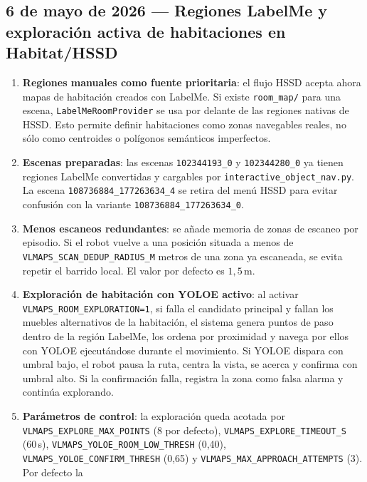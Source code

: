 \documentclass[11pt,a4paper]{article}
\begin{document}
\subsection*{6 de mayo de 2026 --- Regiones LabelMe y exploración activa de habitaciones en Habitat/HSSD}

\begin{enumerate}
  \item \textbf{Regiones manuales como fuente prioritaria}: el flujo HSSD acepta
        ahora mapas de habitación creados con LabelMe. Si existe
        \texttt{room\_map/} para una escena, \texttt{LabelMeRoomProvider} se
        usa por delante de las regiones nativas de HSSD. Esto permite definir
        habitaciones como zonas navegables reales, no sólo como centroides o
        polígonos semánticos imperfectos.
  \item \textbf{Escenas preparadas}: las escenas \texttt{102344193\_0} y
        \texttt{102344280\_0} ya tienen regiones LabelMe convertidas y
        cargables por \texttt{interactive\_object\_nav.py}. La escena
        \texttt{108736884\_177263634\_4} se retira del menú HSSD para evitar
        confusión con la variante \texttt{108736884\_177263634\_0}.
  \item \textbf{Menos escaneos redundantes}: se añade memoria de zonas de
        escaneo por episodio. Si el robot vuelve a una posición situada a menos
        de \texttt{VLMAPS\_SCAN\_DEDUP\_RADIUS\_M} metros de una zona ya
        escaneada, se evita repetir el barrido local. El valor por defecto es
        $1{,}5$\,m.
  \item \textbf{Exploración de habitación con YOLOE activo}: al activar
        \texttt{VLMAPS\_ROOM\_EXPLORATION=1}, si falla el candidato principal
        y fallan los muebles alternativos de la habitación, el sistema genera
        puntos de paso dentro de la región LabelMe, los ordena por proximidad y
        navega por ellos con YOLOE ejecutándose durante el movimiento. Si YOLOE
        dispara con umbral bajo, el robot pausa la ruta, centra la vista, se
        acerca y confirma con umbral alto. Si la confirmación falla, registra
        la zona como falsa alarma y continúa explorando.
  \item \textbf{Parámetros de control}: la exploración queda acotada por
        \texttt{VLMAPS\_EXPLORE\_MAX\_POINTS} (8 por defecto),
        \texttt{VLMAPS\_EXPLORE\_TIMEOUT\_S} (60\,s),
        \texttt{VLMAPS\_YOLOE\_ROOM\_LOW\_THRESH} (0,40),
        \texttt{VLMAPS\_YOLOE\_CONFIRM\_THRESH} (0,65) y
        \texttt{VLMAPS\_MAX\_APPROACH\_ATTEMPTS} (3). Por defecto la

\end{enumerate}
\end{document}
